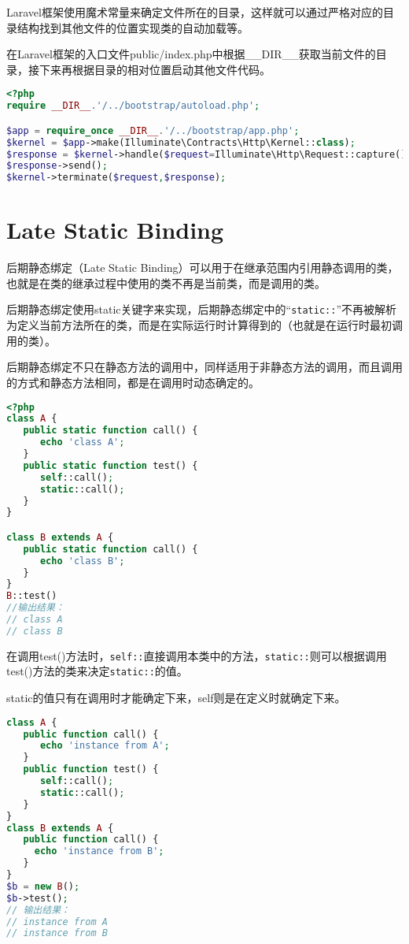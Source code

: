Laravel框架使用魔术常量来确定文件所在的目录，这样就可以通过严格对应的目录结构找到其他文件的位置实现类的自动加载等。

在Laravel框架的入口文件public/index.php中根据\_\_DIR\_\_获取当前文件的目录，接下来再根据目录的相对位置启动其他文件代码。



\begin{lstlisting}[language=PHP]
<?php
require __DIR__.'/../bootstrap/autoload.php';

$app = require_once __DIR__.'/../bootstrap/app.php';
$kernel = $app->make(Illuminate\Contracts\Http\Kernel::class);
$response = $kernel->handle($request=Illuminate\Http\Request::capture());
$response->send();
$kernel->terminate($request,$response);
\end{lstlisting}

\section{Late Static Binding}

后期静态绑定（Late Static Binding）可以用于在继承范围内引用静态调用的类，也就是在类的继承过程中使用的类不再是当前类，而是调用的类。

后期静态绑定使用static关键字来实现，后期静态绑定中的“\texttt{static::}”不再被解析为定义当前方法所在的类，而是在实际运行时计算得到的（也就是在运行时最初调用的类）。

后期静态绑定不只在静态方法的调用中，同样适用于非静态方法的调用，而且调用的方式和静态方法相同，都是在调用时动态确定的。

\begin{lstlisting}[language=PHP]
<?php
class A {
   public static function call() {
      echo 'class A';
   }
   public static function test() {
      self::call();
      static::call();
   }
}

class B extends A {
   public static function call() {
      echo 'class B';
   }
}
B::test()
//输出结果：
// class A
// class B
\end{lstlisting}

在调用test()方法时，\texttt{self::}直接调用本类中的方法，\texttt{static::}则可以根据调用test()方法的类来决定\texttt{static::}的值。

static的值只有在调用时才能确定下来，self则是在定义时就确定下来。



\begin{lstlisting}[language=PHP]
class A {
   public function call() {
      echo 'instance from A';
   }
   public function test() {
      self::call();
      static::call();
   }
}
class B extends A {
   public function call() {
     echo 'instance from B';
   }
}
$b = new B();
$b->test();
// 输出结果：
// instance from A
// instance from B
\end{lstlisting}

